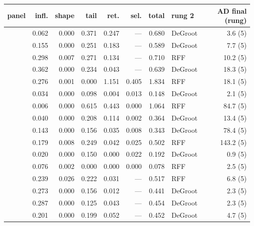 {\small\setlength{\tabcolsep}{2.5pt}
\begin{tabular}{lrrrrrrlr}
\toprule
panel & infl. & shape & tail & ret. & sel. & total & rung 2 & AD final (rung) \\
\midrule
\adamsLo{} & 0.062 & 0.000 & 0.371 & 0.247 & --- & 0.680 & DeGroot & 3.6 (5) \\
\adamsMid{} & 0.155 & 0.000 & 0.251 & 0.183 & --- & 0.589 & DeGroot & 7.7 (5) \\
\adamsHi{} & 0.298 & 0.007 & 0.271 & 0.134 & --- & 0.710 & RFF & 10.2 (5) \\
\becker{} & 0.362 & 0.000 & 0.234 & 0.043 & --- & 0.639 & DeGroot & 18.3 (5) \\
\cmv{} & 0.276 & 0.001 & 0.000 & 1.151 & 0.405 & 1.834 & RFF & 18.1 (5) \\
\house{} & 0.034 & 0.000 & 0.098 & 0.004 & 0.013 & 0.148 & DeGroot & 2.1 (5) \\
\kozitsin{} & 0.006 & 0.000 & 0.615 & 0.443 & 0.000 & 1.064 & RFF & 84.7 (5) \\
\markets{} & 0.040 & 0.000 & 0.208 & 0.114 & 0.002 & 0.364 & DeGroot & 13.4 (5) \\
\vkc{} & 0.143 & 0.000 & 0.156 & 0.035 & 0.008 & 0.343 & DeGroot & 78.4 (5) \\
\vkg{} & 0.179 & 0.008 & 0.249 & 0.042 & 0.025 & 0.502 & RFF & 143.2 (5) \\
\senate{} & 0.020 & 0.000 & 0.150 & 0.000 & 0.022 & 0.192 & DeGroot & 0.9 (5) \\
\spinos{} & 0.076 & 0.002 & 0.000 & 0.000 & 0.000 & 0.078 & RFF & 2.5 (5) \\
\takacsCtl{} & 0.239 & 0.026 & 0.222 & 0.031 & --- & 0.517 & RFF & 6.8 (5) \\
\takacsDis{} & 0.273 & 0.000 & 0.156 & 0.012 & --- & 0.441 & DeGroot & 2.3 (5) \\
\takacsInt{} & 0.287 & 0.000 & 0.125 & 0.043 & --- & 0.454 & DeGroot & 2.3 (5) \\
\takacsOne{} & 0.201 & 0.000 & 0.199 & 0.052 & --- & 0.452 & DeGroot & 4.7 (5) \\
\bottomrule
\end{tabular}}
